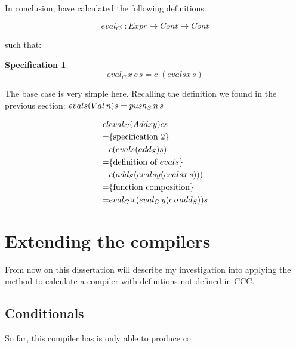 \documentclass {article}
\begin{document}
In conclusion, \BH have calculated the following definitions:

\newcommand{\evalc}{eval_{C}}

	\[ \evalc :: Expr \rightarrow Cont \rightarrow Cont \]

such that:

\newtheorem{bhspec2}{Specification}

\begin{bhspec2}
	\[ \evalc \, x \, c \, s = c \; (evals x \, s) \] 
\end{bhspec2}

The base case is very simple here.
Recalling the definition we found in the previous section:
\( evals (Val \, n) s = push_{S} \, n \, s\)





\begin{eqnarray*}{cl}
		  & \evalc (Add x y) c s \\
	=	  & \{\mbox{specification 2}\} \\
		  & c (evals (\adds) s) \\
	=	  & \{\mbox{definition of $evals$}\} \\
		  & c (\adds (evals y (evals x \, s))) \\
	=	  & \{\mbox{function composition}\} \\
	= 	  & \evalc \, x (\evalc \, y (c \, o \, \adds)) s
\end{eqnarray*}

\section{Extending the compilers}

From now on this dissertation will describe my
investigation into applying the \BH method to calculate a compiler
with definitions not defined in CCC.


\subsection{Conditionals}

So far, this compiler has is only able
to produce co












\end{document}
